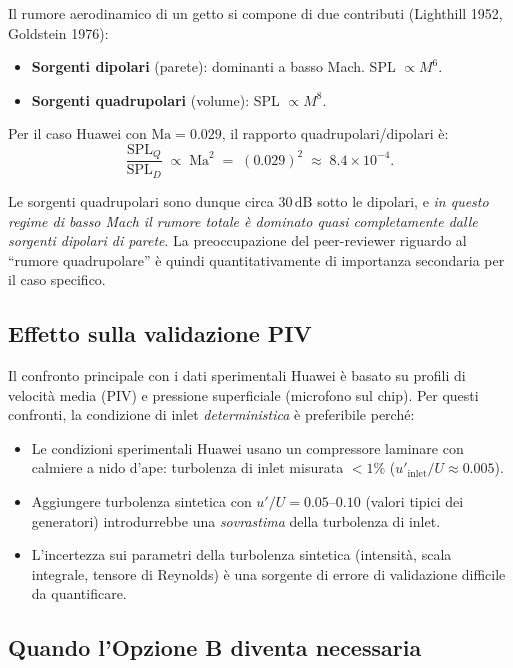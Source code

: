 \documentclass[11pt,a4paper]{article}
\newcommand{\Ma}{\mathrm{Ma}}
\begin{document}
Il rumore aerodinamico di un getto si compone di due contributi
(Lighthill 1952, Goldstein 1976):
\begin{itemize}
  \item \textbf{Sorgenti dipolari} (parete): dominanti a basso
    Mach. SPL $\propto M^{6}$.
  \item \textbf{Sorgenti quadrupolari} (volume): SPL $\propto M^{8}$.
\end{itemize}

Per il caso Huawei con $\Ma=0.029$, il rapporto quadrupolari/dipolari
è:
\begin{equation}
  \frac{\mathrm{SPL}_{Q}}{\mathrm{SPL}_{D}} \;\propto\; \Ma^{2}
   \;=\; (0.029)^{2} \;\approx\; 8.4\times 10^{-4}.
\end{equation}

Le sorgenti quadrupolari sono dunque circa $30\,\mathrm{dB}$ sotto
le dipolari, e \emph{in questo regime di basso Mach il rumore
totale è dominato quasi completamente dalle sorgenti dipolari di
parete}. La preoccupazione del peer-reviewer riguardo al ``rumore
quadrupolare'' è quindi quantitativamente di importanza secondaria
per il caso specifico.

\subsection{Effetto sulla validazione PIV}

Il confronto principale con i dati sperimentali Huawei è basato su
profili di velocità media (PIV) e pressione superficiale (microfono
sul chip). Per questi confronti, la condizione di inlet
\emph{deterministica} è preferibile perché:

\begin{itemize}
  \item Le condizioni sperimentali Huawei usano un compressore
    laminare con calmiere a nido d'ape: turbolenza di inlet
    misurata $<1\%$ ($u'_{\mathrm{inlet}}/U \approx 0.005$).
  \item Aggiungere turbolenza sintetica con $u'/U=0.05$--$0.10$
    (valori tipici dei generatori) introdurrebbe una
    \emph{sovrastima} della turbolenza di inlet.
  \item L'incertezza sui parametri della turbolenza sintetica
    (intensità, scala integrale, tensore di Reynolds) è una sorgente
    di errore di validazione difficile da quantificare.
\end{itemize}

\subsection{Quando l'Opzione B diventa necessaria}
\end{document}
